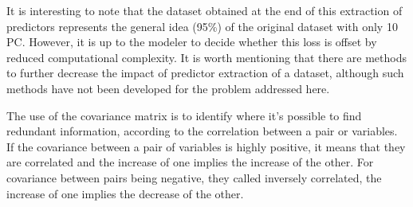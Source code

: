 \documentclass[conference]{IEEEtran}
\begin{document}
It is interesting to note that the dataset obtained at the end of this extraction of predictors represents the general idea (95\%) of the original dataset with only 10 PC. However, it is up to the modeler to decide whether this loss is offset by reduced computational complexity. It is worth mentioning that there are methods to further decrease the impact of predictor extraction of a dataset, although such methods have not been developed for the problem addressed here.

The use of the covariance matrix is to identify where it's possible to find redundant information, according to the correlation between a pair or variables. If the covariance between a pair of variables is highly positive, it means that they are correlated and the increase of one implies the increase of the other. For covariance between pairs being negative, they called inversely correlated, the increase of one implies the decrease of the other.

\end{document}
